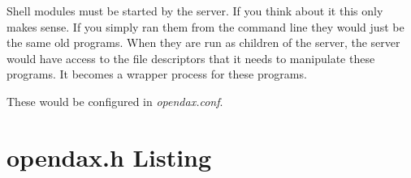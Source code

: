 Shell modules must be started by the \opendax server.  If you think about it this only makes sense.  If you simply ran them from the command line they would just be the same old programs.  When they are run as children of the \opendax server, the server would have access to the file descriptors that it needs to manipulate these programs.  It becomes a wrapper process for these programs.

These would be configured in \textit{opendax.conf}.

\appendix



%


\chapter{opendax.h Listing}


%

\printindex


